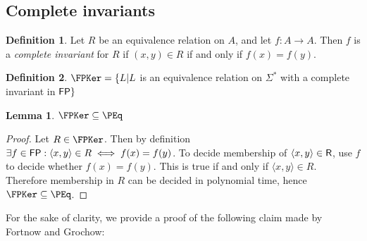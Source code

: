 \documentclass{article}
\newtheorem{lemma}[lemma]{Lemma}
\theoremstyle{definition} \newtheorem{definition}[definition]{Definition}
\newcommand{\sigmastar}{\Sigma^{*}} %
\newcommand{\defn}[1]{\emph{#1}} %
\newcommand{\pair}[2]{\langle#1,#2\rangle} %
\begin{document}


\subsection{Complete invariants}
\begin{definition}
  Let $R$ be an equivalence relation on $A$, and let $f\colon A\to A$. Then $f$
  is a \defn{complete invariant} for $R$ if $(x,y)\in R$ if and only if
  $f(x)=f(y)$.
\end{definition}
\begin{definition}
  $\FPKer=\{L|L$ is an equivalence relation on $\sigmastar$ with a complete
  invariant in ${\mathsf{FP}}\}$
\end{definition}

\begin{lemma}\label{lem:ker_peq}
  $\FPKer\subseteq\PEq$
\end{lemma}
\begin{proof}
  Let $R\in\FPKer$. Then by definition $\exists f\in\FP: \pair{x}{y}\in R\iff
  f(x)=f(y)$. To decide membership of $\pair{x}{y}\in\R$, use $f$ to decide
  whether $f(x)=f(y)$. This is true if and only if $\pair{x}{y}\in
  R$. Therefore membership in $R$ can be decided in polynomial time, hence
  $\FPKer\subseteq\PEq$.
\end{proof}

For the sake of clarity, we provide a proof of the following claim made by
Fortnow and Grochow:
\end{document}
